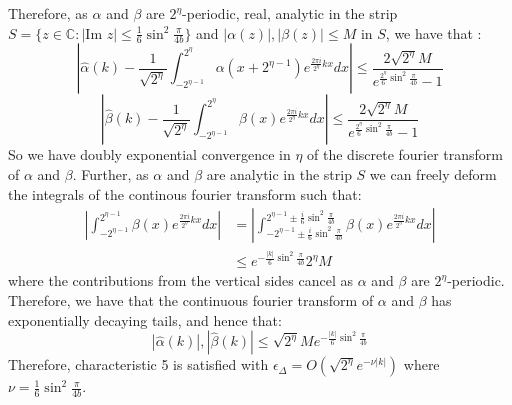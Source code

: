 \documentclass[aps,floatfix,10pt,amssymb,amsfont,amsmath,superscriptaddress,float,nofootinbib,longbibliography,nobalancelastpage,twocolumn]{revtex4-2}
\begin{document}
Therefore, as $\alpha$ and $\beta$ are $2^{\eta}$-periodic, real, analytic in the strip $S =\{z \in \mathbb{C}: |\text{Im } z| \leq \frac{1}{6}\sin^2 \frac{\pi}{4b}\}$ and $|\alpha(z)|, |\beta(z)| \leq M$ in $S$, we have that \cite{trefethen2014exponentially}:
\begin{equation}
\label{eq:conv1}
    \left|\hat\alpha(k) - \frac{1}{\sqrt{2^{\eta}}}\int_{-2^{\eta-1}}^{2^{\eta}}\alpha(x+2^{\eta-1})e^{\frac{2\pi i}{2^{\eta}}kx} dx\right| \leq \frac{2\sqrt{2^{\eta}} M}{e^{\frac{2^{\eta}}{6}\sin^2 \frac{\pi}{4b}}-1}
\end{equation}
\begin{equation}
\label{eq:conv2}
    \left|\hat\beta(k) - \frac{1}{\sqrt{2^{\eta}}}\int_{-2^{\eta-1}}^{2^{\eta}}\beta(x)e^{\frac{2\pi i}{2^{\eta}}kx} dx\right| \leq  \frac{2 \sqrt{2^{\eta}}M}{e^{\frac{2^{\eta}}{6}\sin^2 \frac{\pi}{4b}}-1}
\end{equation}
So we have doubly exponential convergence in $\eta$ of the discrete fourier transform of $\alpha$ and $\beta$. Further, as $\alpha$ and $\beta$ are analytic in the strip $S$ we can freely deform the integrals of the continous fourier transform such that:
\begin{align}
    \left|\int_{-2^{\eta-1}}^{2^{\eta-1}}\beta(x)e^{\frac{2\pi i}{2^{\eta}}kx} dx\right| &=\left| \int_{-2^{\eta-1}\pm\frac{i}{6}\sin^2 \frac{\pi}{4b}}^{2^{\eta-1}\pm\frac{i}{6}\sin^2 \frac{\pi}{4b}}\beta(x)e^{\frac{2\pi i}{2^{\eta}}kx} dx\right|\\
    &\leq e^{-\frac{|k|}{6}\sin^2 \frac{\pi}{4b}}2^{\eta}M
    \label{eq:tails}
\end{align}
where the contributions from the vertical sides cancel as $\alpha$ and $\beta$ are $2^{\eta}$-periodic. Therefore, we have that the continuous fourier transform of $\alpha$ and $\beta$ has exponentially decaying tails, and hence that:
\begin{equation}
\label{eq:exactdecay}
    |\hat \alpha(k)|, |\hat \beta(k)| \leq \sqrt{2^{\eta}}Me^{-\frac{|k|}{6}\sin^2 \frac{\pi}{4b}}
\end{equation}
Therefore, characteristic 5 is satisfied with $\epsilon_{\Delta} =O\left( \sqrt{2^{\eta}}e^{-\nu |k|}\right)$ where $\nu = \frac{1}{6}\sin^2\frac{\pi}{4b}$.
\end{document}

